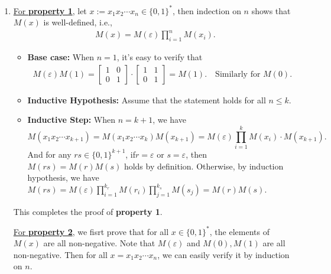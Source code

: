 \begin{answer}
	\begin{enumerate}[label=\alph*).]
		\item \underline{For \textbf{property 1}}, let $x := x_1x_2\cdots x_n \in \{0,1\}^*$, then indection on $n$ shows that $M(x)$ is well-defined, i.e., 
		\begin{align*}
			M(x) = M(\varepsilon) \prod_{i=1}^{n} M(x_i).
		\end{align*}
		\begin{itemize}
			\item \textbf{Base case:} When $n = 1$, it's easy to verify that 
			\begin{align*}
				M(\varepsilon)M(1)= \begin{bmatrix}1&0\\0&1\end{bmatrix}\cdot \begin{bmatrix}1&1\\0&1\end{bmatrix} = M(1). \quad \text{Similarly for $M(0)$.} 
			\end{align*}
			\item \textbf{Inductive Hypothesis:} Assume that the statement holds for all $n\le k$.
			\item \textbf{Inductive Step:} When $n = k+1$, we have 
			\[
				M(x_1x_2\cdots x_{k+1}) = M(x_1x_2\cdots x_k)M(x_{k+1}) = M(\varepsilon) \prod_{i=1}^{k} M(x_i)\cdot M(x_{k+1}).
			\]
			And for any $rs \in \{0,1\}^{k+1}$, if$r = \varepsilon$ or $s = \varepsilon$, then $M(rs) = M(r)M(s)$ holds by definition. Otherwise, by induction hypothesis, we have $M(rs) = M(\varepsilon) \prod_{i=1}^{k_r} M(r_i) \prod_{j=1}^{k_s} M(s_j) = M(r)M(s)$.
		\end{itemize}
		This completes the proof of \textbf{property 1}.
		
		\underline{For \textbf{property 2}}, we fisrt prove that for all $x\in \{0,1\}^*$, the elements of $M(x)$ are all non-negative. Note that $M(\varepsilon)$ and $M(0), M(1)$ are all non-negative. Then for all $x = x_1x_2\cdots x_n$, we can easily verify it by induction on $n$.


\end{enumerate}
\end{answer}

